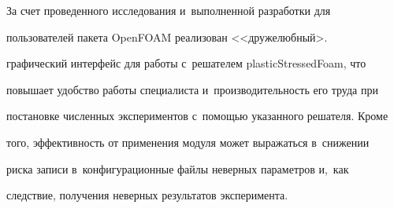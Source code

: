    За счет проведенного исследования и~выполненной разработки для 


пользователей пакета \mbox{OpenFOAM} реализован <<дружелюбный>. 


графический интерфейс для работы с~решателем \mbox{plasticStressedFoam}, что 


повышает удобство работы специалиста и~про\-из\-во\-ди\-тель\-ность его труда при 


постановке чис\-лен\-ных экспериментов с~по\-мощью указанного решателя. Кроме 


того, эф\-фек\-тив\-ность от применения модуля может выражаться в~снижении 


риска записи в~конфигурационные файлы неверных па\-ра\-мет\-ров и,~как 


следствие, получения неверных результатов эксперимента.


   


